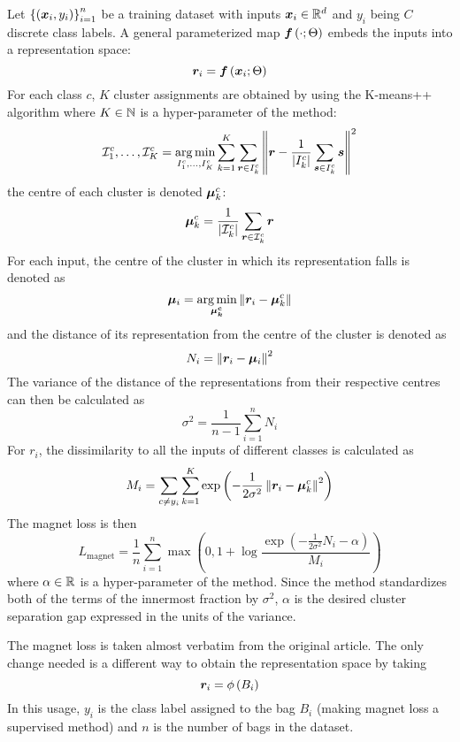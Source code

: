 Let \( \left\{ \left( \bm{x}_i, y_i \right) \right\}_{i = 1}^n \) be a training dataset with inputs \( \bm{x}_i \in \mathbb{R}^d \) and \( y_i \) being \( C \) discrete class labels. A general parameterized map \( \bm{f} \left( \cdot; \Theta \right) \) embeds the inputs into a representation space:
\[ \bm{r}_i = \bm{f} \left( \bm{x}_i; \Theta \right) \]
For each class \( c \), \( K \) cluster assignments are obtained by using the K-means++ algorithm \cite{macqueen_methods_1967, arthur_k-means++:_2007} where \( K \in \mathbb{N} \) is a hyper-parameter of the method:
\[ \mathcal{I}_1^c, \dots, \mathcal{I}_K^c = \operatorname*{arg\,min}_{I_1^c, \dots, I_K^c} \sum_{k = 1}^K \sum_{\bm{r} \in I_k^c} \left\lVert \bm{r} - \frac{1}{\left\lvert I_k^c \right\rvert} \sum_{\bm{s} \in I_k^c} \bm{s} \right\rVert^2  \]
the centre of each cluster is denoted \( \bm{\mu}_k^c \):
\[ \bm{\mu}_k^c = \frac{1}{\left\lvert \mathcal{I}_k^c \right\rvert} \sum_{\bm{r} \in \mathcal{I}_k^c} \bm{r} \]
For each input, the centre of the cluster in which its representation falls is denoted as
\[ \bm{\mu}_i = \operatorname*{arg\,min}_{\bm{\mu_k^c}} \left\lVert \bm{r}_i - \bm{\mu}_k^c \right\rVert \]
and the distance of its representation from the centre of the cluster is denoted as
\[ N_i = \left\lVert \bm{r}_i - \bm{\mu}_i \right\rVert^2 \]
The variance of the distance of the representations from their respective centres can then be calculated as
\[ \sigma^2 = \frac{1}{n - 1} \sum_{i = 1}^n N_i \]
For \( r_i \), the dissimilarity to all the inputs of different classes is calculated as
\[ M_i = \sum_{c \neq y_i} \sum_{k = 1}^K \exp \left( - \frac{1}{2 \sigma^2} \left\lVert \bm{r}_i - \bm{\mu}_k^c \right\rVert^2 \right) \]
The magnet loss is then
\[ L_\mathrm{magnet} = \frac{1}{n} \sum_{i = 1}^n \max \left( 0, 1 + \log \frac{\exp \left( - \frac{1}{2 \sigma^2} N_i - \alpha \right)}{M_i} \right) \]
where \( \alpha \in \mathbb{R} \) is a hyper-parameter of the method. Since the method standardizes both of the terms of the innermost fraction by \( \sigma^2 \), \( \alpha \) is the desired cluster separation gap expressed in the units of the variance.

The magnet loss is taken almost verbatim from the original article. The only change needed is a different way to obtain the representation space by taking
\[ \bm{r}_i = \phi \left( B_i \right) \]
In this usage, \( y_i \) is the class label assigned to the bag \( B_i \) (making magnet loss a supervised method) and \( n \) is the number of bags in the dataset.

